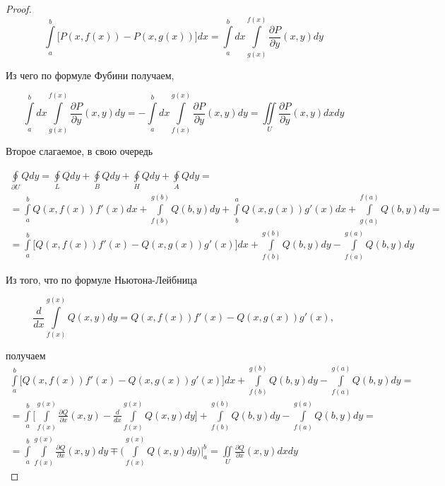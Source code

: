\documentclass[a5paper]{article}
\theoremstyle{plain}
\theoremstyle{definition}
\numberwithin{through}{section}
\numberwithin{equation}{section}
\begin{document}
\begin{proof}
	\begin{equation*}
	\int\limits_{a}^{b} \bigg[P(x, f(x)) - P(x, g(x))\bigg] dx = \int\limits_{a}^{b} dx \int\limits_{g(x)}^{f(x)} \frac{\partial P}{\partial y} (x, y) dy
	\end{equation*}
	
	Из чего по формуле Фубини получаем,
	
	\begin{equation*}
	\int\limits_{a}^{b} dx \int\limits_{g(x)}^{f(x)} \frac{\partial P}{\partial y} (x, y) dy = - \int\limits_{a}^{b} dx \int\limits_{f(x)}^{g(x)} \frac{\partial P}{\partial y} (x, y) dy = \iint\limits_{U} \frac{\partial P}{\partial y} (x, y) dxdy
	\end{equation*}
	
	
	Второе слагаемое, в свою очередь
	
	\begin{align*}
	\oint\limits_{\partial U} Qdy = \oint\limits_{L} Qdy + \oint\limits_{B} Qdy + \oint\limits_{H} Qdy + \oint\limits_{A} Qdy = \\ = \int\limits_{a}^{b} Q(x, f(x)) f'(x) dx + \int\limits_{f(b)}^{g(b)} Q(b, y)dy + \int\limits_{b}^{a} Q(x, g(x)) g'(x) dx + \int\limits_{g(a)}^{f(a)} Q(b, y)dy =\\ =
	\int\limits_{a}^{b} \bigg[ Q(x, f(x)) f'(x) - Q(x, g(x)) g'(x) \bigg] dx + \int\limits_{f(b)}^{g(b)} Q(b, y)dy - \int\limits_{f(a)}^{g(a)} Q(b, y)dy
	\end{align*}
	
	Из того, что по формуле Ньютона-Лейбница
	
	\begin{equation*}
	\frac{d}{dx} \int\limits_{f(x)}^{g(x)} Q(x, y) dy = Q(x, f(x)) f'(x) - Q(x, g(x)) g'(x),
	\end{equation*}
	
	получаем
	\begin{align*}
	\int\limits_{a}^{b} \bigg[ Q(x, f(x)) f'(x) - Q(x, g(x)) g'(x) \bigg] dx + \int\limits_{f(b)}^{g(b)} Q(b, y)dy - \int\limits_{f(a)}^{g(a)} Q(b, y)dy = \\ = \int\limits_{a}^{b} \bigg[ \int\limits_{f(x)}^{g(x)} \frac{\partial Q}{\partial x} (x, y) - \frac{d}{dx} \int\limits_{f(x)}^{g(x)} Q(x, y) dy\bigg]  + \int\limits_{f(b)}^{g(b)} Q(b, y)dy - \int\limits_{f(a)}^{g(a)} Q(b, y)dy = \\ = \int\limits_{a}^{b}  \int\limits_{f(x)}^{g(x)} \frac{\partial Q}{\partial x} (x, y) dy \mp \bigg( \int\limits_{f(x)}^{g(x)} Q(x, y) dy\bigg) \bigg|_{a}^{b} = \iint\limits_{U} \frac{\partial Q}{\partial x} (x, y) dxdy
	\end{align*}
\end{proof}
\end{document}

